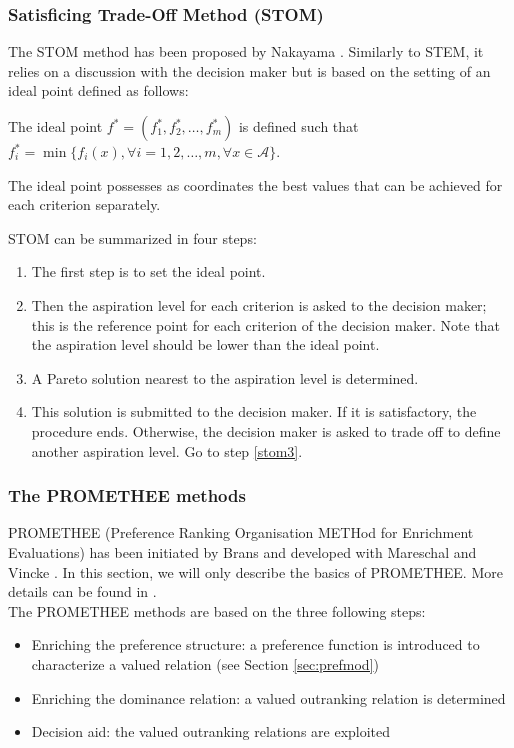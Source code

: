 \subsubsection{Satisficing Trade-Off Method (STOM)}
The STOM method has been proposed by Nakayama \cite{nakayama84}. Similarly to STEM, it relies on a discussion with the decision maker but is based on the setting of an ideal point defined as follows:
\begin{definition}
The ideal point $f^*=(f_1^*, f_2^*, \dots, f_m^*)$ is defined such that $f_i^* = \min \{f_i(x), \forall i=1, 2, \dots, m, \forall x \in \mathcal{A}\}$.
\end{definition}
The ideal point possesses as coordinates the best values that can be achieved for each criterion separately.

STOM can be summarized in four steps:
\begin{enumerate}
\item The first step is to set the ideal point.
\item Then the aspiration level for each criterion is asked to the decision maker; this is the reference point for each criterion of the decision maker. Note that the aspiration level should be lower than the ideal point.
\item \label{stom3} A Pareto solution nearest to the aspiration level is determined.
\item This solution is submitted to the decision maker. If it is satisfactory, the procedure ends. Otherwise, the decision maker is asked to trade off to define another aspiration level. Go to step \ref{stom3}.
\end{enumerate}

\subsubsection{The PROMETHEE methods}
PROMETHEE (Preference Ranking Organisation METHod for Enrichment Evaluations) has been initiated by Brans \cite{Brans1} and developed with Mareschal \cite{mares2ejor88} and Vincke \cite{BransMarechalVincke84}. In this section, we will only describe the basics of PROMETHEE. More details can be found in \cite{Beh2010}.\\
The PROMETHEE methods are based on the three following steps:
\begin{itemize}
\item Enriching the preference structure: a preference function is introduced to characterize a valued relation (see Section \ref{sec:prefmod})
\item Enriching the dominance relation: a valued outranking relation is determined
\item Decision aid: the valued outranking relations are exploited
\end{itemize}

